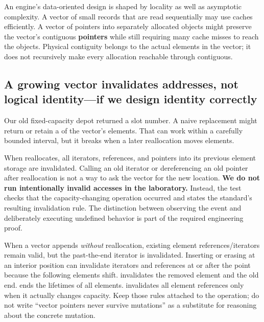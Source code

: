 An engine's data-oriented design is shaped by locality as well as asymptotic complexity. A vector of small records that are read sequentially may use caches efficiently. A vector of pointers into separately allocated objects might preserve the vector's contiguous \textbf{pointers} while still requiring many cache misses to reach the objects. Physical contiguity belongs to the actual  elements in the vector; it does not recursively make every allocation reachable through  contiguous.

\subsection{A growing vector invalidates addresses, not logical identity---if we design identity correctly}\label{05-engine-i-ch005-a-growing-vector-invalidates-addresses-not-logical-identityif-we-design-identity-correctly}

\hypertarget{05-engine-i-ch005-a-growing-vector-invalidates-addresses-not-logical-identityif-we-design-identity-correctly}{}

Our old fixed-capacity depot returned a slot number. A naive replacement might return  or retain a  of the vector's elements. That can work within a carefully bounded interval, but it breaks when a later reallocation moves elements.

When  reallocates, all iterators, references, and pointers into its previous element storage are invalidated. Calling an old iterator or dereferencing an old pointer after reallocation is not a way to ask the vector for the new location. \textbf{We do not run intentionally invalid accesses in the laboratory.} Instead, the test checks that the capacity-changing operation occurred and states the standard's resulting invalidation rule. The distinction between observing the event and deliberately executing undefined behavior is part of the required engineering proof.

When a vector appends \emph{without} reallocation, existing element references/iterators remain valid, but the past-the-end iterator is invalidated. Inserting or erasing at an interior position can invalidate iterators and references at or after the point because the following elements shift.  invalidates the removed element and the old end.  ends the lifetimes of all elements.  invalidates all element references only when it actually changes capacity. Keep those rules attached to the operation; do not write ``vector pointers never survive mutations'' as a substitute for reasoning about the concrete mutation.

